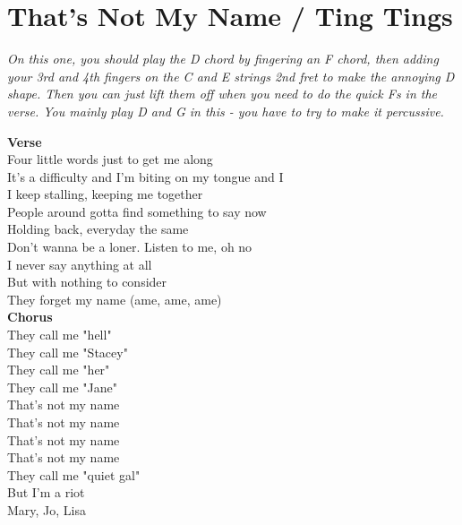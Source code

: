 \section{That's Not My Name / Ting Tings}\label{sec:thatsnotmyname}
\DmajorEasy
\Fmajor
\Gmajor
\Amajor

\emph{On this one, you should play the D chord by fingering an F chord, then adding your 3rd and 4th fingers on the C and E strings 2nd fret to make the annoying D shape. Then you can just lift them off when you need to do the quick Fs in the verse. You mainly play D and G in this - you have to try to make it percussive.}

\textbf{Verse}\\
Four little words just to get me along \\
It's a difficulty and I'm biting on my tongue and I\\
I keep stalling, keeping me together \\
People around gotta find something to say now \\
Holding back, everyday the same \\
Don't wanna be a loner. Listen to me, oh no \\
I never say anything at all \\
But with nothing to consider\\
They forget my name (ame, ame, ame) \\
\textbf{Chorus}\\
They call me "hell" \\
They call me "Stacey" \\
They call me "her" \\
They call me "Jane" \\
That's not my name\\
That's not my name \\
That's not my name\\
That's not my name \\
They call me "quiet gal"\\
But I'm a riot \\
Mary, Jo, Lisa \\

